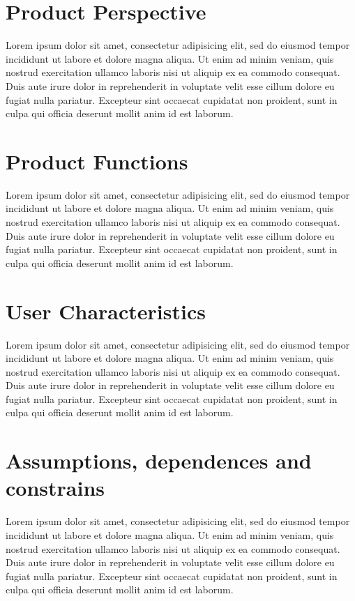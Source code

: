 \documentclass[10pt,a4paper]{report}
\begin{document}
	\section{Product Perspective}
	Lorem ipsum dolor sit amet, consectetur adipisicing elit, sed do eiusmod
	tempor incididunt ut labore et dolore magna aliqua. Ut enim ad minim veniam,
	quis nostrud exercitation ullamco laboris nisi ut aliquip ex ea commodo
	consequat. Duis aute irure dolor in reprehenderit in voluptate velit esse
	cillum dolore eu fugiat nulla pariatur. Excepteur sint occaecat cupidatat non
	proident, sunt in culpa qui officia deserunt mollit anim id est laborum.
	
	\section{Product Functions}
	Lorem ipsum dolor sit amet, consectetur adipisicing elit, sed do eiusmod
	tempor incididunt ut labore et dolore magna aliqua. Ut enim ad minim veniam,
	quis nostrud exercitation ullamco laboris nisi ut aliquip ex ea commodo
	consequat. Duis aute irure dolor in reprehenderit in voluptate velit esse
	cillum dolore eu fugiat nulla pariatur. Excepteur sint occaecat cupidatat non
	proident, sunt in culpa qui officia deserunt mollit anim id est laborum.
	
	\section{User Characteristics}
	Lorem ipsum dolor sit amet, consectetur adipisicing elit, sed do eiusmod
	tempor incididunt ut labore et dolore magna aliqua. Ut enim ad minim veniam,
	quis nostrud exercitation ullamco laboris nisi ut aliquip ex ea commodo
	consequat. Duis aute irure dolor in reprehenderit in voluptate velit esse
	cillum dolore eu fugiat nulla pariatur. Excepteur sint occaecat cupidatat non
	proident, sunt in culpa qui officia deserunt mollit anim id est laborum.
	
	\section{Assumptions, dependences and constrains}
	Lorem ipsum dolor sit amet, consectetur adipisicing elit, sed do eiusmod
	tempor incididunt ut labore et dolore magna aliqua. Ut enim ad minim veniam,
	quis nostrud exercitation ullamco laboris nisi ut aliquip ex ea commodo
	consequat. Duis aute irure dolor in reprehenderit in voluptate velit esse
	cillum dolore eu fugiat nulla pariatur. Excepteur sint occaecat cupidatat non
	proident, sunt in culpa qui officia deserunt mollit anim id est laborum.
	
\end{document}
